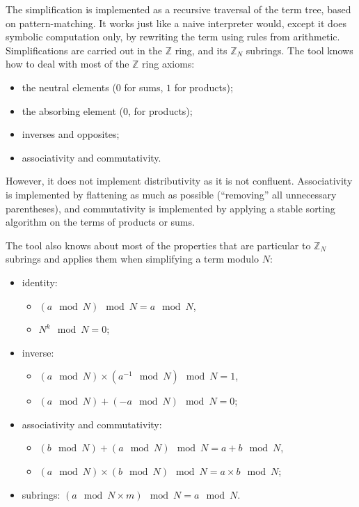 \documentclass[10pt]{article}
\theoremstyle{definition}
\theoremstyle{theorem}
\newcommand{\Z}{\mathbb{Z}}
\begin{document}
The simplification is implemented as a recursive traversal of the term tree, based on pattern-matching.
It works just like a naive interpreter would, except it does symbolic computation only, by rewriting the term using rules from arithmetic.
Simplifications are carried out in the $\Z$ ring, and its $\Z_N$ subrings.
The tool knows how to deal with most of the $\Z$ ring axioms:
\begin{itemize}
\item the neutral elements ($0$ for sums, $1$ for products);
\item the absorbing element ($0$, for products);
\item inverses and opposites;
\item associativity and commutativity.
\end{itemize}
However, it does not implement distributivity as it is not confluent. Associativity is implemented by flattening as much as possible (``removing'' all unnecessary parentheses), and commutativity is implemented by applying a stable sorting algorithm on the terms of products or sums.

The tool also knows about most of the properties that are particular to $\Z_N$ subrings and applies them when simplifying a term modulo $N$:
\begin{itemize}
\item identity:
  \begin{itemize}
  \item $(a \mod N) \mod N = a \mod N$,
  \item $N^k \mod N = 0$;
  \end{itemize}
\item inverse:
  \begin{itemize}
  \item $(a \mod N) \times (a^{-1} \mod N) \mod N = 1$,
  \item $(a \mod N) + (-a \mod N) \mod N = 0$;
  \end{itemize}
\item associativity and commutativity:
  \begin{itemize}
  \item $(b \mod N) + (a \mod N) \mod N = a + b \mod N$,
  \item $(a \mod N) \times (b \mod N) \mod N = a \times b \mod N$;
  \end{itemize}
\item subrings: $(a \mod N \times m) \mod N = a \mod N$.
\end{itemize}
\end{document}
